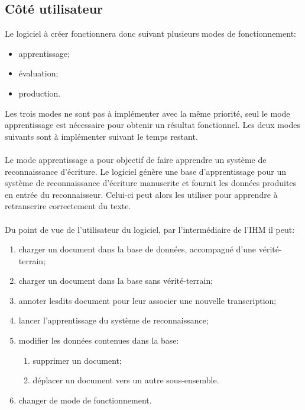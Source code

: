 \subsection{Côté utilisateur}

Le logiciel à créer fonctionnera donc suivant plusieurs modes de fonctionnement:

\begin{itemize}
	\item apprentissage;
	\item évaluation;
	\item production.
\end{itemize}

Les trois modes ne sont pas à implémenter avec la même priorité, seul le mode apprentissage est nécessaire pour obtenir un résultat fonctionnel. Les deux modes suivants sont à implémenter suivant le temps restant. 

\paragraph{}

Le mode apprentissage a pour objectif de faire apprendre un système de reconnaissance d’écriture. Le logiciel génère une base d’apprentissage pour un système de reconnaissance d’écriture manuscrite et fournit les données produites en entrée du reconnaisseur. Celui-ci peut alors les utiliser pour apprendre à retranscrire correctement du texte.

\paragraph{}

Du point de vue de l'utilisateur du logiciel, par l’intermédiaire de l’IHM il peut:

\begin{enumerate}
	\item charger un document dans la base de données, accompagné d’une vérité-terrain;
	\item charger un document dans la base sans vérité-terrain;
	\item annoter lesdits document pour leur associer une nouvelle transcription;
	\item lancer l’apprentissage du système de reconnaissance;
	\item modifier les données contenues dans la base:
		\begin{enumerate}
			\item supprimer un document;
			\item déplacer un document vers un autre sous-ensemble.
		\end{enumerate}
	\item changer de mode de fonctionnement.
\end{enumerate}

